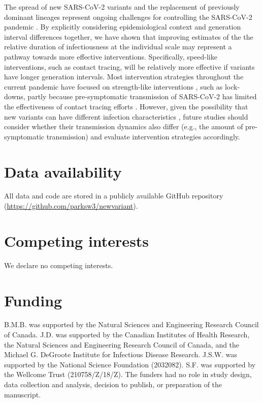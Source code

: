 \documentclass[12pt]{article}
\begin{document}
The spread of new SARS-CoV-2 variants and the replacement of previously dominant lineages represent ongoing challenges for controlling the SARS-CoV-2 pandemic \citep{abdool2021new,fontanet2021sars,walensky2021sars}.  
By explicitly considering epidemiological context and generation interval differences together, we have shown that improving estimates of the the relative duration of infectiousness at the individual scale may represent a pathway towards more effective interventions. 
Specifically, speed-like interventions, such as contact tracing, will be relatively more effective if variants have longer generation intervals.
Most intervention strategies throughout the current pandemic have focused on strength-like interventions \citep{flaxman2020Rt}, such as lock-downs, partly because pre-symptomatic transmission of SARS-CoV-2 has limited the effectiveness of contact tracing efforts \citep{hellewell2020feasibility}.
However, given the possibility that new variants can have different infection characteristics \citep{kissler2021densely}, future studies should consider whether their transmission dynamics also differ (e.g., the amount of pre-symptomatic transmission) and evaluate intervention strategies accordingly.

\section*{Data availability}

All data and code are stored in a publicly available GitHub repository (\url{https://github.com/parksw3/newvariant}).

\section*{Competing interests}

We declare no competing interests.

\section*{Funding}

B.M.B. was supported by the Natural Sciences and Engineering Research Council of Canada. 
J.D. was supported by the Canadian Institutes of Health Research, 
the Natural Sciences and Engineering Research Council of Canada, 
and the Michael G. DeGroote Institute for Infectious Disease Research.
J.S.W. was supported by the National Science Foundation (2032082).
S.F. was supported by the Wellcome Trust (210758/Z/18/Z).
The funders had no role in study design, data collection and analysis, decision to publish, or preparation of the manuscript.

\pagebreak


\end{document}
